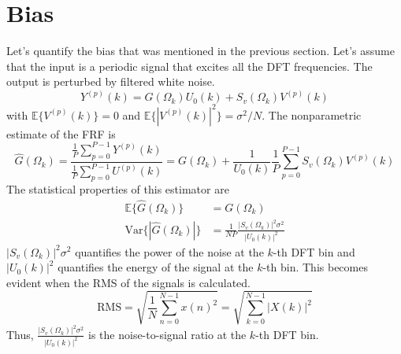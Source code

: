 \section{Bias}
\label{sec:bias}
Let's quantify the bias that was mentioned in the previous section. Let's assume that the input is a periodic signal that excites all the DFT frequencies. The output is perturbed by filtered white noise.
\begin{equation*}
    Y^{(p)}(k) = G(\Omega_k)U_0(k) + S_v(\Omega_k) V^{(p)}(k)
\end{equation*}
with $\mathbb{E}\{V^{(p)}(k)\} = 0$ and $\mathbb{E}\{|V^{(p)}(k)|^2\} = \sigma^2/N$. The nonparametric estimate of the FRF is
\begin{equation*}
    \hat G(\Omega_k) = \frac{\frac{1}{P}\sum_{p=0}^{P-1}  Y^{(p)}(k)}{\frac{1}{P}\sum_{p=0}^{P-1}  U^{(p)}(k)} = G(\Omega_k) + \frac{1}{U_0(k)} \frac{1}{P}\sum_{p=0}^{P-1} S_v(\Omega_k) V^{(p)}(k)
\end{equation*}
The statistical properties of this estimator are
\begin{align*}
    \mathbb{E}\{\hat G(\Omega_k)\} &= G(\Omega_k)\\
    \mathrm{Var}\{|\hat G(\Omega_k)|\} &= \frac{1}{N\!P}\frac{|S_v(\Omega_k)|^2 \sigma^2}{|U_0(k)|^2}
\end{align*}
$|S_v(\Omega_k)|^2 \sigma^2$ quantifies the power of the noise at the $k$-th DFT bin and $|U_0(k)|^2$ quantifies the energy of the signal at the $k$-th bin. This becomes evident when the RMS of the signals is calculated.
\begin{equation*}
    \text{RMS} = \sqrt{\frac{1}{N}\sum_{n=0}^{N-1} x(n)^2} = \sqrt{\sum_{k=0}^{N-1} |X(k)|^2}
\end{equation*}
Thus, $\frac{|S_v(\Omega_k)|^2 \sigma^2}{|U_0(k)|^2}$ is the noise-to-signal ratio at the $k$-th DFT bin.

